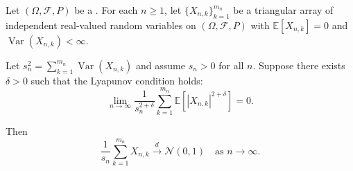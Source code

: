 \begin{theorem} \label{theorem:lyapunov_central_limit_theorem}
Let $(\Omega, \mathcal{F}, P)$ be a . For each $n \geq 1$, let $\{X_{n,k}\}_{k=1}^{m_n}$ be a triangular array of independent real-valued random variables on $(\Omega, \mathcal{F}, P)$ with $\mathbb{E}[X_{n,k}] = 0$ and $\operatorname{Var}(X_{n,k}) < \infty$.

Let $s_n^2 = \sum_{k=1}^{m_n} \operatorname{Var}(X_{n,k})$ and assume $s_n > 0$ for all $n$. Suppose there exists $\delta > 0$ such that the Lyapunov condition holds:
$$\lim_{n \to \infty} \frac{1}{s_n^{2 + \delta}} \sum_{k=1}^{m_n} \mathbb{E}\left[|X_{n,k}|^{2 + \delta}\right] = 0.$$

Then
$$\frac{1}{s_n} \sum_{k=1}^{m_n} X_{n,k} \xrightarrow{d} \mathcal{N}(0, 1) \quad \text{as } n \to \infty.$$
\end{theorem}